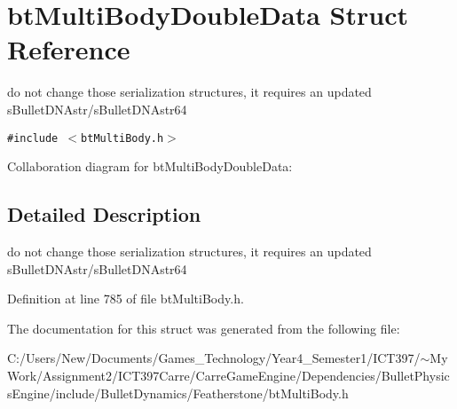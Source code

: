 \hypertarget{structbt_multi_body_double_data}{
\section{btMultiBodyDoubleData Struct Reference}
\label{structbt_multi_body_double_data}
}
do not change those serialization structures, it requires an updated sBulletDNAstr/sBulletDNAstr64  


{\tt \#include $<$btMultiBody.h$>$}

Collaboration diagram for btMultiBodyDoubleData:

\subsection{Detailed Description}
do not change those serialization structures, it requires an updated sBulletDNAstr/sBulletDNAstr64 

Definition at line 785 of file btMultiBody.h.

The documentation for this struct was generated from the following file:\begin{CompactItemize}
\item 
C:/Users/New/Documents/Games\_\-Technology/Year4\_\-Semester1/ICT397/$\sim$My Work/Assignment2/ICT397Carre/CarreGameEngine/Dependencies/BulletPhysicsEngine/include/BulletDynamics/Featherstone/btMultiBody.h\end{CompactItemize}
